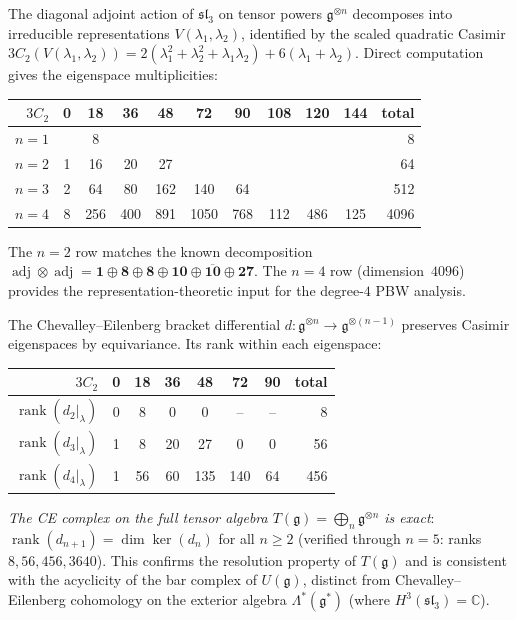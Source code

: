 \begin{computation}
\label{comp:sl3-casimir-decomp}

The diagonal adjoint action of $\mathfrak{sl}_3$ on tensor powers
$\mathfrak{g}^{\otimes n}$ decomposes into irreducible representations
$V(\lambda_1, \lambda_2)$, identified by the scaled quadratic Casimir
$3C_2(V(\lambda_1,\lambda_2)) = 2(\lambda_1^2 + \lambda_2^2 + \lambda_1\lambda_2) + 6(\lambda_1 + \lambda_2)$.
Direct computation
gives the eigenspace multiplicities:
\begin{center}
\begin{tabular}{r|ccccccccc|r}
$3C_2$ & 0 & 18 & 36 & 48 & 72 & 90 & 108 & 120 & 144 & total \\
\hline
$n=1$ & & 8 & & & & & & & & 8 \\
$n=2$ & 1 & 16 & 20 & 27 & & & & & & 64 \\
$n=3$ & 2 & 64 & 80 & 162 & 140 & 64 & & & & 512 \\
$n=4$ & 8 & 256 & 400 & 891 & 1050 & 768 & 112 & 486 & 125 & 4096
\end{tabular}
\end{center}
The $n=2$ row matches the known decomposition
$\operatorname{adj} \otimes \operatorname{adj}
= \mathbf{1} \oplus \mathbf{8} \oplus \mathbf{8}
\oplus \mathbf{10} \oplus \overline{\mathbf{10}} \oplus \mathbf{27}$.
The $n=4$ row (dimension~$4096$) provides the representation-theoretic
input for the degree-$4$ PBW analysis.

The Chevalley--Eilenberg bracket differential
$d\colon \mathfrak{g}^{\otimes n} \to \mathfrak{g}^{\otimes (n-1)}$
preserves Casimir eigenspaces by equivariance.  Its rank within each eigenspace:
\begin{center}
\begin{tabular}{r|cccccc|r}
$3C_2$ & 0 & 18 & 36 & 48 & 72 & 90 & total \\
\hline
$\operatorname{rank}(d_2|_\lambda)$ & 0 & 8 & 0 & 0 & -- & -- & 8 \\
$\operatorname{rank}(d_3|_\lambda)$ & 1 & 8 & 20 & 27 & 0 & 0 & 56 \\
$\operatorname{rank}(d_4|_\lambda)$ & 1 & 56 & 60 & 135 & 140 & 64 & 456 \\
\end{tabular}
\end{center}
\emph{The CE complex on the full tensor algebra
$T(\mathfrak{g}) = \bigoplus_n \mathfrak{g}^{\otimes n}$ is exact}:
$\operatorname{rank}(d_{n+1}) = \dim \ker(d_n)$ for all $n \geq 2$
(verified through $n = 5$: ranks $8, 56, 456, 3640$).
This confirms the resolution property of $T(\mathfrak{g})$
and is consistent with the acyclicity of the bar complex of $U(\mathfrak{g})$,
distinct from Chevalley--Eilenberg cohomology on the exterior algebra
$\Lambda^*(\mathfrak{g}^*)$ (where $H^3(\mathfrak{sl}_3) = \mathbb{C}$).


\end{computation}
